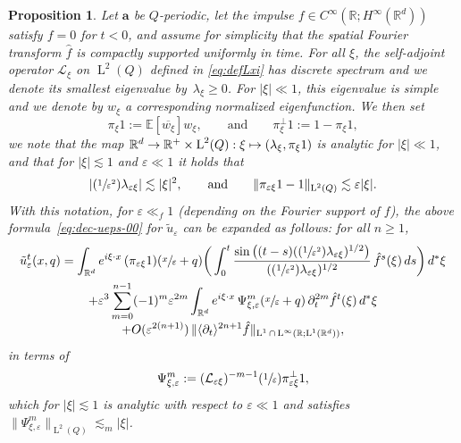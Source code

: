 \documentclass[JEP,XML,SOM,Unicode,published]{cedram}
\newcommand{\Psfrac}[2]{(\sfrac{#1}{#2})}
\newcommand\mto{\mathchoice{\longmapsto}{\mapsto}{\mapsto}{\mapsto}}
\theoremstyle{plain}
\newtheorem{prop0}[theor0]{Proposition}
\newenvironment{prop}
{\renewcommand{\qedsymbol}{$\lozenge$}\pushQED{\qed}\begin{prop0}}
{\popQED\end{prop0}}
\theoremstyle{definition}
\numberwithin{equation}{section}
\newcommand{\e}{\varepsilon}
\newcommand{\Lc}{\mathcal{L}}
\newcommand{\R}{\mathbb R}
\newcommand{\Aa}{\boldsymbol a}
\newcommand{\Ld}{\operatorname{L}}
\newcommand{\expec}[1]{\mathbb{E}\left[ #1 \right]}
\begin{document}
\begin{prop}\label{prop:Bloch}
Let $\Aa$ be $Q$-periodic, let the impulse $f\in C^\infty(\R;H^\infty(\R^d))$ satisfy $f=0$ for $t<0$, and assume for simplicity that the spatial Fourier transform $\hat f$ is compactly supported uniformly in time. For all $\xi$, the self-adjoint operator $\Lc_\xi$ on $\Ld^2(Q)$ {defined in \eqref{eq:defLxi}} has discrete spectrum and we denote its smallest eigenvalue by~$\lambda_\xi\ge0$. For $|\xi|\ll1$, this eigenvalue is simple and we denote by $w_\xi$ a corresponding normalized eigenfunction.
We then set\vspace*{-3pt}
\begin{equation}\label{eq:defin-pi-ibot}
\pi_\xi1:=\expec{\overline{w_\xi}}w_\xi,\qquad\text{and}\qquad\pi_\xi^\bot1:=1-\pi_\xi1,
\end{equation}
we note that the map $\R^d\to\R^+\times\Ld^2( Q):\xi\mto (\lambda_\xi,\pi_\xi1)$ is analytic for $|\xi|\ll1$, and that for $|\xi|\lesssim1$ and $\e\ll1$ {it holds that}\vspace*{-3pt}
\begin{equation}\label{eq:prop-lam-pi-eps}
|\Psfrac1{\e^2}\lambda_{\e\xi}|\lesssim|\xi|^2,\qquad\text{and}\qquad\|\pi_{\e\xi}1-1\|_{\Ld^2( Q)}\lesssim\e|\xi|.
\end{equation}
With this notation, for $\e\ll_f1$ (depending on the Fourier support of $f$), the above formula~\eqref{eq:dec-ueps-00} for $\tilde u_\e$ can be expanded as follows: for all $n\ge1$,\vspace*{-3pt}
\begin{multline}\label{eq:full-decomp-per-u}
\tilde u_\e^t(x,q)=\int_{\R^d}e^{i\xi\cdot x}\,(\pi_{\e\xi}1)(\sfrac x\e+q)\bigg(\int_0^t\frac{\sin\big((t-s)(\Psfrac1{\e^2}\lambda_{\e \xi})^{1/2}\big)}{(\Psfrac1{\e^2}\lambda_{\e \xi})^{1/2}}\,\hat f^s(\xi)\,ds\bigg)\,d^*\xi\\
+\e^3\sum_{m=0}^{n-1}(-1)^m\e^{2m}\int_{\R^d}e^{i\xi\cdot x}\,\Psi_{\xi,\e}^m(\sfrac x\e+q)\,\partial_t^{2m}\hat f^t(\xi)\,d^*\xi\\[-3pt]
+O(\e^{2(n+1)})\,\|\langle\partial_t\rangle^{2n+1}\hat f\|_{\Ld^1\cap\Ld^\infty(\R;\Ld^1(\R^d))},
\end{multline}
in terms of\vspace*{-3pt}
\begin{equation}\label{eq:defin-Psi-0}
\Psi_{\xi,\e}^m:=(\Lc_{\e\xi})^{-m-1}\Psfrac1\e\pi_{\e\xi}^\bot1,
\end{equation}
which for $|\xi|\lesssim1$ is analytic with respect to $\e\ll1$ and satisfies
$\|\Psi_{\xi,\e}^m\|_{\Ld^2(Q)}\lesssim_m|\xi|$.
\end{prop}
\end{document}
